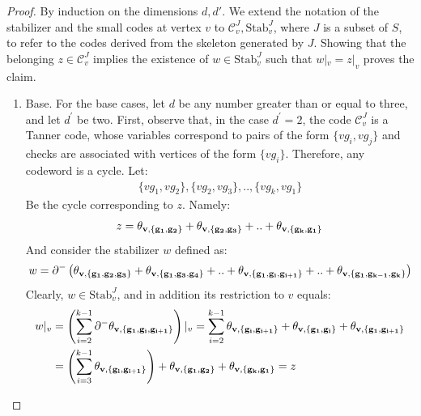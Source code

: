 \begin{proof}
  By induction on the dimensions $d, d'$. We extend the notation of the stabilizer and the small codes at vertex $v$ to $\mathcal{C}_{v}^{J}, \text{Stab}_{v}^{J}$, where $J$ is a subset of $S$, to refer to the codes derived from the skeleton generated by $J$. Showing that the belonging $z\in \mathcal{C}_{v}^{J}$ implies the existence of $w \in \text{Stab}_{v}^{J}$ such that $w|_{v} =z|_{v}$ proves the claim.
  \begin{enumerate}
    \item Base. For the base cases, let $d$ be any number greater than or equal to three, and let $d^{\prime}$ be two. First, observe that, in the case $d^{\prime}=2$, the code $\mathcal{C}_{v}^{J}$ is a Tanner code, whose variables correspond to pairs of the form $\{vg_{i}, vg_{j} \}$ and checks are associated with vertices of the form $\{vg_{i} \}$. Therefore, any codeword is a cycle. Let:
      \begin{equation*}
        \begin{split}
          \{vg_{1},vg_{2}\},\{vg_{2},vg_{3}\},..,\{vg_{k},vg_{1}\}
        \end{split}
      \end{equation*}
    Be the cycle corresponding to $z$. Namely:
      \begin{equation*}
        \begin{split}
          z = \mathbf{\theta_{v ,\{g_{1},g_{2}\}} } + \mathbf{\theta_{v ,\{g_{2},g_{3}\}} } + ..+ \mathbf{\theta_{v ,\{g_{k},g_{1}\}} }
        \end{split}
      \end{equation*}
    And consider the stabilizer $w$ defined as:
      \begin{equation*}
        \begin{split}
          w =  \partial^{-}\left(  \mathbf{\theta_{v ,\{g_{1},g_{2},g_{3}\}} } + \mathbf{\theta_{v ,\{g_{1},g_{3},g_{4}\}} } + .. +  \mathbf{\theta_{v ,\{g_{1},g_{i},g_{i+1}\}} } + .. + \mathbf{\theta_{v ,\{g_{1},g_{k-1},g_{k}\}} } \right)
        \end{split}
      \end{equation*}
    Clearly, $w \in \text{Stab}_{v}^{J}$, and in addition its restriction to $v$ equals:
      \begin{equation*}
        \begin{split}
          w|_{v} &=  \left( \sum_{i=2}^{k-1}\partial^{-}\mathbf{\theta_{v ,\{g_{1},g_{i},g_{i+1}\}} }  \right)|_{v} = \sum_{i=2}^{k-1} \mathbf{\theta_{v ,\{g_{i},g_{i+1}\}} }  + \mathbf{\theta_{v ,\{g_{1},g_{i}\}} }  + \mathbf{\theta_{v ,\{g_{1},g_{i+1}\}} } \\
          & = \left(\sum_{i=3}^{k-1} \mathbf{\theta_{v ,\{g_{i},g_{i+1}\}} } \right) + \mathbf{\theta_{v ,\{g_{1},g_{2}\}} }  + \mathbf{\theta_{v ,\{g_{k},g_{1}\}} } = z
        \end{split}
      \end{equation*}
      

\end{enumerate}
\end{proof}
